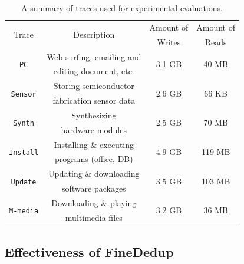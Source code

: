 \begin{table}[t]
	\renewcommand{\tabcolsep}{1.4mm} 
	\centering
	\begin{tabular}{c|c|c|c}
		\hline
		\multirow{2}{*}{Trace} 		& \multirow{2}{*}{Description} 		& Amount of 	& Amount of \\
							   		& 			 				  		& Writes 		& Reads \\
		\hline
		\hline
		\multirow{2}{*}{\texttt{PC}} 		& Web surfing, emailing and 		& \multirow{2}{*}{3.1 GB} 	& \multirow{2}{*}{40 MB} \\
									   	   	& editing document, etc.    		& 						 	& 						  \\
		\hline
		\multirow{2}{*}{\texttt{Sensor}}    	& Storing semiconductor 		& \multirow{2}{*}{2.6 GB} 	& \multirow{2}{*}{66 KB} \\
											   	& fabrication sensor data  		& 							& 					   \\

		\hline
		\multirow{2}{*}{\texttt{Synth}} 	   	& Synthesizing 	  					& \multirow{2}{*}{2.5 GB} 	& \multirow{2}{*}{70 MB} \\
											   	& hardware modules 					&   						& 						  \\

		\hline
		\multirow{2}{*}{\texttt{Install}} 	 & Installing \& executing 			& \multirow{2}{*}{4.9 GB} 	& \multirow{2}{*}{119 MB} \\
										   	 & programs (office, DB)			& 						   	& 					   \\

		\hline
		\multirow{2}{*}{\texttt{Update}} 	 & Updating \& downloading 			& \multirow{2}{*}{3.5 GB} 	& \multirow{2}{*}{103 MB} \\
										   	 & software packages				& 						   	& 					   \\

		\hline
		\multirow{2}{*}{\texttt{M-media}} 	& Downloading \& playing 			& \multirow{2}{*}{3.2 GB} 	& \multirow{2}{*}{36 MB} \\
					 					 	& multimedia files		   			& 						 	&		   				   \\
		\hline
	\end{tabular}
	\caption{A summary of traces used for experimental evaluations.}
	\label{tab:traces}
\end{table}


\subsection{Effectiveness of FineDedup}

